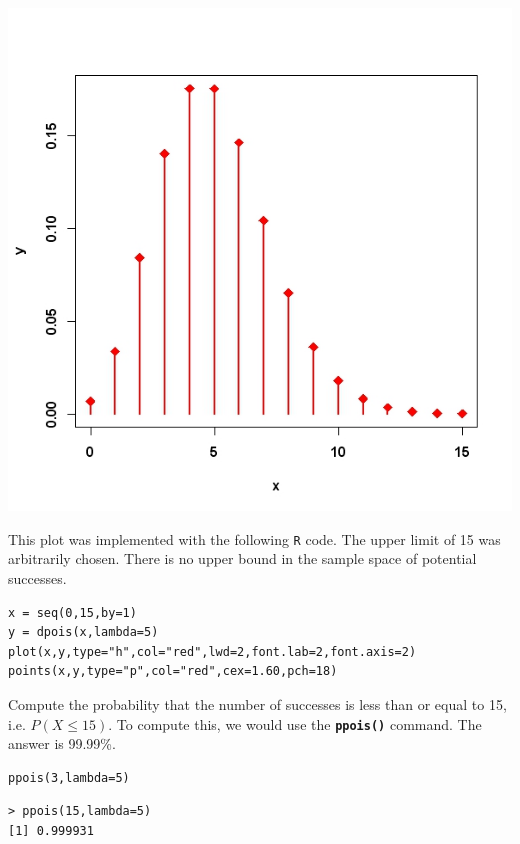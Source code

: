 \documentclass[a4paper,12pt]{article}
\begin{document}
 \begin{center}
 \includegraphics[scale=0.50]{dpoisPlot}
 \end{center}
 
This plot was implemented with the following \texttt{R} code.
The upper limit of 15 was arbitrarily chosen. There is no upper bound in the sample space of potential successes.
\begin{framed}
\begin{verbatim}
x = seq(0,15,by=1)
y = dpois(x,lambda=5)
plot(x,y,type="h",col="red",lwd=2,font.lab=2,font.axis=2)
points(x,y,type="p",col="red",cex=1.60,pch=18)
\end{verbatim}
\end{framed}
Compute the probability that the number of successes is less than or equal to 15, i.e. $P(X \leq 15)$. To compute this, we would use the \textbf{\texttt{ppois()}} command. The answer is 99.99\%.

\begin{framed}
\begin{verbatim}
ppois(3,lambda=5)
\end{verbatim}
\end{framed}
\begin{verbatim}
> ppois(15,lambda=5)
[1] 0.999931
\end{verbatim}
\end{document}
